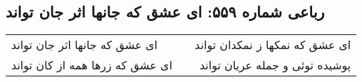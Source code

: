 \begin{center}
\section*{رباعی شماره ۵۵۹: ای عشق که جانها اثر جان تواند}
\label{sec:0559}
\begin{longtable}{l p{0.5cm} r}
ای عشق که جانها اثر جان تواند
&&
ای عشق که نمکها ز نمکدان تواند
\\
ای عشق که زرها همه از کان تواند
&&
پوشیده توئی و جمله عریان تواند
\\
\end{longtable}
\end{center}

